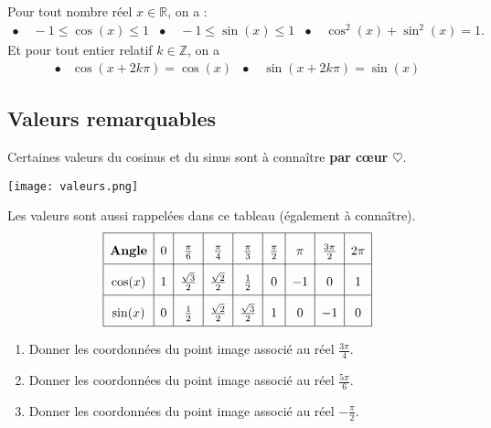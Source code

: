 \documentclass[11pt]{article}
\begin{document}
\begin{prop}
  Pour tout nombre réel $x\in\mathbb{R}$, on a :\\[-7mm]
  \begin{align*}
    \bullet&\; -1\leq\cos(x)\leq 1 &
    \bullet&\; -1\leq\sin(x)\leq 1 &
    \bullet&\; \cos^2(x)+\sin^2(x) = 1.
  \end{align*}
  Et pour tout entier relatif $k\in\mathbb{Z}$, on a\\[-7mm]
  \begin{align*}
    \bullet&\cos(x+2k\pi) = \cos(x) &
    \bullet&\;\sin(x+2k\pi)=\sin(x)
  \end{align*}
\end{prop}

\subsection{Valeurs remarquables}
\noindent Certaines valeurs du cosinus et du sinus sont à connaître
\textbf{par cœur $\heartsuit$}.
\begin{center}
\texttt{[image: valeurs.png]}
\end{center}
Les valeurs sont aussi rappelées dans ce tableau (également à connaître).
\[
  \def\arraystretch{2}
  \begin{array}[]{|c|c|c|c|c|c|c|c|c|}
    \hline
    \textbf{Angle} & 0 & \frac{\pi}{6} & \frac{\pi}{4} & \frac{\pi}{3} &
    \frac{\pi}{2} & \pi & \frac{3\pi}{2} & 2\pi \\
    \hline
    \cos(x) & 1 & \frac{\sqrt3}{2} & \frac{\sqrt2}{2} &
    \frac{1}{2} & 0 & -1 & 0 & 1 \\
    \hline
    \sin(x) & 0 & \frac{1}{2} & \frac{\sqrt2}{2} & \frac{\sqrt3}{2} & 1 & 0 & -1
    & 0 \\
    \hline
  \end{array}
\]
\begin{app}
  \begin{enumerate}
    \item Donner les coordonnées du point image associé au réel
      $\frac{3\pi}{4}$.
    \item Donner les coordonnées du point image associé au réel
      $\frac{5\pi}{6}$.
    \item Donner les coordonnées du point image associé au réel
      $-\frac{\pi}{2}$.
  \end{enumerate}
\end{app}
\end{document}
